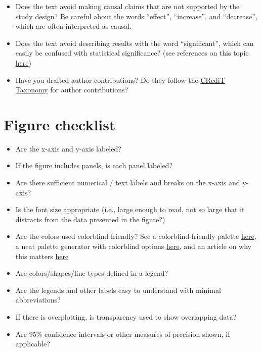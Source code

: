 \documentclass[
]{book}
\providecommand{\tightlist}{%
  \setlength{\itemsep}{0pt}\setlength{\parskip}{0pt}}
\begin{document}
\begin{itemize}
\item
  Does the text avoid making causal claims that are not supported by the study design? Be careful about the words ``effect'', ``increase'', and ``decrease'', which are often interpreted as causal.
\item
  Does the text avoid describing results with the word ``significant'', which can easily be confused with statistical significance? (see references on this topic \href{https://journals.lww.com/epidem/Fulltext/2001/05000/The_Value_of_P.2.aspx}{here})
\item
  Have you drafted author contributions? Do they follow the \href{https://journals.plos.org/plosone/s/authorship/?utm_source=plos\&utm_medium=blog\&utm_campaign=plos-1607-credit\#loc-author-contributions}{CRediT Taxonomy} for author contributions?
\end{itemize}

\hypertarget{figure-checklist}{%
\section{Figure checklist}\label{figure-checklist}}

\begin{itemize}
\tightlist
\item
  Are the x-axis and y-axis labeled?
\item
  If the figure includes panels, is each panel labeled?
\item
  Are there sufficient numerical / text labels and breaks on the x-axis and y-axis?
\item
  Is the font size appropriate (i.e., large enough to read, not so large that it distracts from the data presented in the figure?)
\item
  Are the colors used colorblind friendly? See a colorblind-friendly palette \href{http://www.cookbook-r.com/Graphs/Colors_(ggplot2)/\#a-colorblind-friendly-palette}{here}, a neat palette generator with colorblind options \href{https://medialab.github.io/iwanthue/?utm_source=Nature+Briefing\&utm_campaign=2c68711076-briefing-dy-20211006\&utm_medium=email\&utm_term=0_c9dfd39373-2c68711076-44335685}{here}, and an article on why this matters \href{https://www.nature.com/articles/d41586-021-02696-z}{here}
\item
  Are colors/shapes/line types defined in a legend?
\item
  Are the legends and other labels easy to understand with minimal abbreviations?
\item
  If there is overplotting, is transparency used to show overlapping data?
\item
  Are 95\% confidence intervals or other measures of precision shown, if applicable?
\end{itemize}
\end{document}
